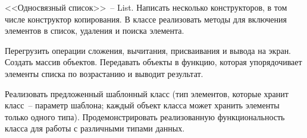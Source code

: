 
<<Односвязный список>>~-- List. Написать несколько конструкторов, в том числе
конструктор копирования. В классе реализовать методы для включения элементов в
список, удаления и поиска элемента.

Перегрузить операции сложения, вычитания,
присваивания и вывода на экран. Создать массив объектов. Передавать объекты в
функцию, которая упорядочивает элементы списка по возрастанию и выводит результат.

Реализовать предложенный шаблонный класс (тип элементов, которые
хранит класс~-- параметр шаблона; каждый объект класса может хранить
элементы только одного типа). Продемонстрировать реализованную
функциональность класса для работы с различными типами данных.

